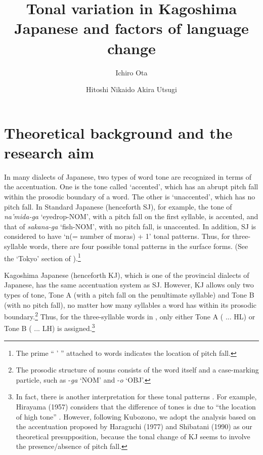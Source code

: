 \documentclass[output=paper]{LSP/langsci}
\author{Ichiro Ota\affiliation{Kagoshima University}\and Hitoshi Nikaido\affiliation{Fukuoka Jo Gakuin University} \lastand Akira Utsugi\affiliation{Nagoya University}}
\title{Tonal variation in {K}agoshima {J}apanese and factors of language change}
\begin{document}
 

\section{Theoretical background and the research aim}
\largerpage[-2]
In many dialects of Japanese, two types of word tone are recognized in terms of the accentuation. One is the tone called `accented', which has an abrupt pitch fall within the prosodic boundary of a word. The other is `unaccented', which has no pitch fall. In Standard Japanese (henceforth SJ), for example, the tone of \textit{na'mida-ga} `eyedrop-NOM', with a pitch fall on the first syllable, is accented, and that of \textit{sakana-ga} `fish-NOM', with no pitch fall, is unaccented. In addition, SJ is considered to have `n(= number of moras) + 1' tonal patterns. Thus, for three-syllable words, there are four possible tonal patterns in the surface forms. (See the `Tokyo' section of ).\footnote{ The prime “ ’ ” attached to words indicates the location of pitch fall.}
 

Kagoshima Japanese (henceforth KJ), which is one of the provincial dialects of Japanese, has the same accentuation system as SJ. However, KJ allows only two types of tone, Tone A (with a pitch fall on the penultimate syllable) and Tone B (with no pitch fall), no matter how many syllables a word has within its prosodic boundary.\footnote{ The prosodic structure of nouns consists of the word itself and a case-marking particle, such as -\textit{ga} `NOM' and -\textit{o} `OBJ'.} Thus, for the three-syllable words in , only either Tone A ( ... HL) or Tone B ( ... LH) is assigned.\footnote{ In fact, there is another interpretation for these tonal patterns \citep{kubozono_tonal_2007}. For example, Hirayama (1957) %
considers that the difference of tones is due to ``the location of high tone'' \citep[327]{kubozono_tonal_2007}. However, following Kubozono, we adopt the analysis based on the accentuation proposed by Haraguchi (1977) and Shibatani (1990) %
as our theoretical presupposition, because the tonal change of KJ seems to involve the presence/absence of pitch fall.  
} 
 
\end{document}
